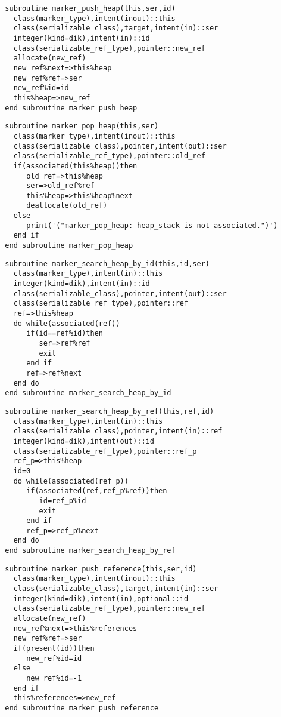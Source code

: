 \begin{Verbatim}
  subroutine marker_push_heap(this,ser,id)
    class(marker_type),intent(inout)::this
    class(serializable_class),target,intent(in)::ser
    integer(kind=dik),intent(in)::id
    class(serializable_ref_type),pointer::new_ref
    allocate(new_ref)
    new_ref%next=>this%heap
    new_ref%ref=>ser
    new_ref%id=id
    this%heap=>new_ref
  end subroutine marker_push_heap
\end{Verbatim}
  
\begin{Verbatim}
  subroutine marker_pop_heap(this,ser)
    class(marker_type),intent(inout)::this
    class(serializable_class),pointer,intent(out)::ser
    class(serializable_ref_type),pointer::old_ref
    if(associated(this%heap))then
       old_ref=>this%heap
       ser=>old_ref%ref
       this%heap=>this%heap%next
       deallocate(old_ref)
    else
       print('("marker_pop_heap: heap_stack is not associated.")')
    end if
  end subroutine marker_pop_heap
\end{Verbatim}

\begin{Verbatim}
  subroutine marker_search_heap_by_id(this,id,ser)
    class(marker_type),intent(in)::this
    integer(kind=dik),intent(in)::id
    class(serializable_class),pointer,intent(out)::ser
    class(serializable_ref_type),pointer::ref
    ref=>this%heap
    do while(associated(ref))
       if(id==ref%id)then
          ser=>ref%ref
          exit
       end if
       ref=>ref%next
    end do
  end subroutine marker_search_heap_by_id
\end{Verbatim}

\begin{Verbatim}
  subroutine marker_search_heap_by_ref(this,ref,id)
    class(marker_type),intent(in)::this
    class(serializable_class),pointer,intent(in)::ref
    integer(kind=dik),intent(out)::id
    class(serializable_ref_type),pointer::ref_p
    ref_p=>this%heap
    id=0
    do while(associated(ref_p))
       if(associated(ref,ref_p%ref))then
          id=ref_p%id
          exit
       end if
       ref_p=>ref_p%next
    end do
  end subroutine marker_search_heap_by_ref
\end{Verbatim}

\begin{Verbatim}
  subroutine marker_push_reference(this,ser,id)
    class(marker_type),intent(inout)::this
    class(serializable_class),target,intent(in)::ser
    integer(kind=dik),intent(in),optional::id
    class(serializable_ref_type),pointer::new_ref
    allocate(new_ref)
    new_ref%next=>this%references
    new_ref%ref=>ser
    if(present(id))then
       new_ref%id=id
    else
       new_ref%id=-1
    end if
    this%references=>new_ref
  end subroutine marker_push_reference
\end{Verbatim}
  
